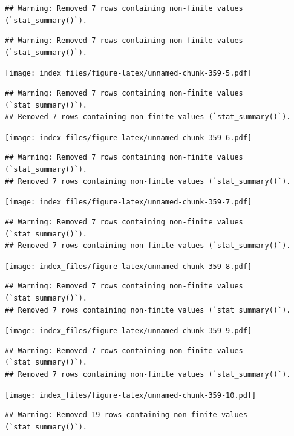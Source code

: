 \documentclass[
]{article}
\begin{document}
\begin{verbatim}
## Warning: Removed 7 rows containing non-finite values (`stat_summary()`).
\end{verbatim}

\begin{verbatim}
## Warning: Removed 7 rows containing non-finite values (`stat_summary()`).
\end{verbatim}

\texttt{[image: index\_files/figure-latex/unnamed-chunk-359-5.pdf]}

\begin{verbatim}
## Warning: Removed 7 rows containing non-finite values (`stat_summary()`).
## Removed 7 rows containing non-finite values (`stat_summary()`).
\end{verbatim}

\texttt{[image: index\_files/figure-latex/unnamed-chunk-359-6.pdf]}

\begin{verbatim}
## Warning: Removed 7 rows containing non-finite values (`stat_summary()`).
## Removed 7 rows containing non-finite values (`stat_summary()`).
\end{verbatim}

\texttt{[image: index\_files/figure-latex/unnamed-chunk-359-7.pdf]}

\begin{verbatim}
## Warning: Removed 7 rows containing non-finite values (`stat_summary()`).
## Removed 7 rows containing non-finite values (`stat_summary()`).
\end{verbatim}

\texttt{[image: index\_files/figure-latex/unnamed-chunk-359-8.pdf]}

\begin{verbatim}
## Warning: Removed 7 rows containing non-finite values (`stat_summary()`).
## Removed 7 rows containing non-finite values (`stat_summary()`).
\end{verbatim}

\texttt{[image: index\_files/figure-latex/unnamed-chunk-359-9.pdf]}

\begin{verbatim}
## Warning: Removed 7 rows containing non-finite values (`stat_summary()`).
## Removed 7 rows containing non-finite values (`stat_summary()`).
\end{verbatim}

\texttt{[image: index\_files/figure-latex/unnamed-chunk-359-10.pdf]}

\begin{verbatim}
## Warning: Removed 19 rows containing non-finite values (`stat_summary()`).
\end{verbatim}
\end{document}
